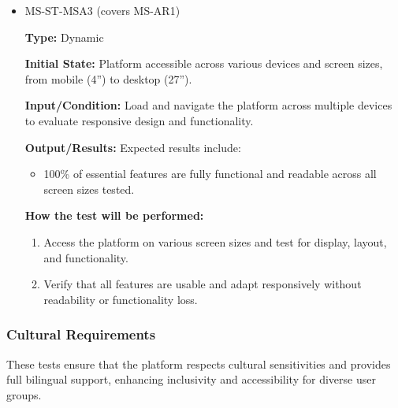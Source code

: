 \documentclass[12pt, titlepage]{article}
\begin{document}
\begin{itemize}
  \item MS-ST-MSA3 (covers MS-AR1)
  \begin{mdframed}[linewidth=0.5mm] 
    \textbf{Type:} Dynamic \par 
    \textbf{Initial State:} Platform accessible across various devices and screen sizes, from mobile (4”) to desktop (27”). \par 
    \textbf{Input/Condition:} Load and navigate the platform across multiple devices to evaluate responsive design and functionality. \par 
    \textbf{Output/Results:} Expected results include: 
    \begin{itemize} 
      \item 100\% of essential features are fully functional and readable across all screen sizes tested. 
    \end{itemize} \par 
    \textbf{How the test will be performed:} 
    \begin{enumerate}[noitemsep] 
      \item Access the platform on various screen sizes and test for display, layout, and functionality. 
      \item Verify that all features are usable and adapt responsively without readability or functionality loss. 
    \end{enumerate} 
  \end{mdframed} 
\end{itemize}



\subsubsection{Cultural Requirements}

These tests ensure that the platform respects cultural sensitivities and provides full bilingual support, enhancing inclusivity and accessibility for diverse user groups.
\end{document}
